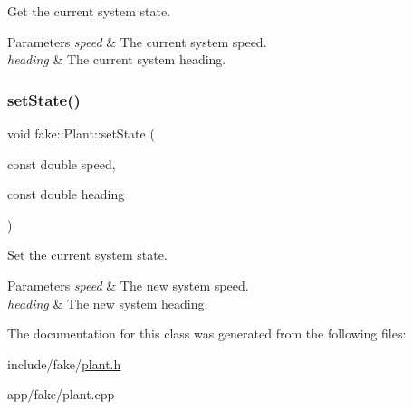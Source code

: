 Get the current system state. 


\begin{DoxyParams}{Parameters}
{\em speed} & The current system speed. \\
\hline
{\em heading} & The current system heading. \\
\hline
\end{DoxyParams}
\mbox{\label{classfake_1_1_plant_aa6f602aaabebcc84a03c2ae7a4878c05}} 
\subsubsection{\texorpdfstring{set\+State()}{setState()}}
{\footnotesize\ttfamily void fake\+::\+Plant\+::set\+State (\begin{DoxyParamCaption}\item[{const double}]{speed,  }\item[{const double}]{heading }\end{DoxyParamCaption})}



Set the current system state. 


\begin{DoxyParams}{Parameters}
{\em speed} & The new system speed. \\
\hline
{\em heading} & The new system heading. \\
\hline
\end{DoxyParams}


The documentation for this class was generated from the following files\+:\begin{DoxyCompactItemize}
\item 
include/fake/\hyperlink{plant_8h}{plant.\+h}\item 
app/fake/plant.\+cpp\end{DoxyCompactItemize}
